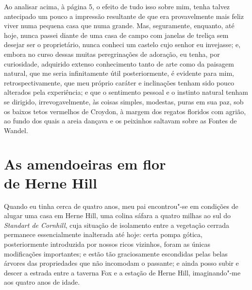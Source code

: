 {{{{{{{{{{{{%
Ao analisar acima, à página 5, o efeito de tudo isso sobre mim,
tenha talvez antecipado um pouco a impressão resultante de que era
provavelmente mais feliz viver numa pequena casa que numa grande. Mas,
seguramente, enquanto, até hoje, nunca passei diante de uma casa de
campo com janelas de treliça sem desejar ser o proprietário, nunca
conheci um castelo cujo senhor eu invejasse; e, embora no curso dessas
muitas peregrinações de adoração, eu tenha, por curiosidade, adquirido
extenso conhecimento tanto de arte como da paisagem natural, que me
seria infinitamente útil posteriormente, é evidente para mim,
retrospectivamente, que meu próprio caráter e inclinações tenham sido
pouco alterados pela experiência; e que o sentimento pessoal e o
instinto natural tenham se dirigido, irrevogavelmente, às coisas
simples, modestas, puras em sua paz, sob os baixos tetos vermelhos de
Croydon, à margem dos regatos floridos com agrião, ao fundo dos quais a
areia dançava e os peixinhos saltavam sobre as Fontes de Wandel.

\chapter*{As amendoeiras em flor\\de Herne Hill} %

Quando eu tinha cerca de quatro anos, meu pai encontrou"-se em
condições de alugar uma casa em Herne Hill, uma colina sáfara a quatro
milhas ao sul do \textit{Standart de Cornhill}, cuja situação de isolamento
entre a vegetação cerrada permanece essencialmente inalterada até hoje:
certa pompa gótica, posteriormente introduzida por nossos ricos
vizinhos, foram as únicas modificações importantes; e estão tão
graciosamente escondidas pelas belas árvores das propriedades que não
incomodam o passante; e ainda posso subir e descer a estrada entre a
taverna Fox e a estação de Herne Hill, imaginando"-me aos quatro anos de
idade.

}}}}}}}}}}}}
